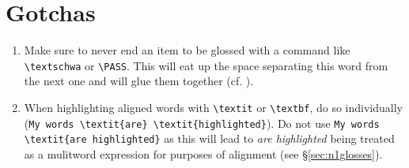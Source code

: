 \documentclass[output=paper]{langscibook}
\newcommand{\cmd}[1]{\texttt{\textbackslash#1}}
\begin{document}

\section{Gotchas}
\begin{enumerate}
\item Make sure to never end an item to be glossed with a command like \cmd{textschwa} or \cmd{PASS}. This will eat up the space separating this word from the next one and will glue them together (cf. ).
\item When highlighting aligned words with \cmd{textit} or \cmd{textbf}, do so individually (\verb+My words \textit{are} \textit{highlighted}+). Do not use \verb+My words+ \verb+\textit{are highlighted}+ as this will lead to \textit{are highlighted} being treated as a mulitword expression for purposes of alignment (see §\ref{sec:n1glosses}).
\end{enumerate}
\end{document}
